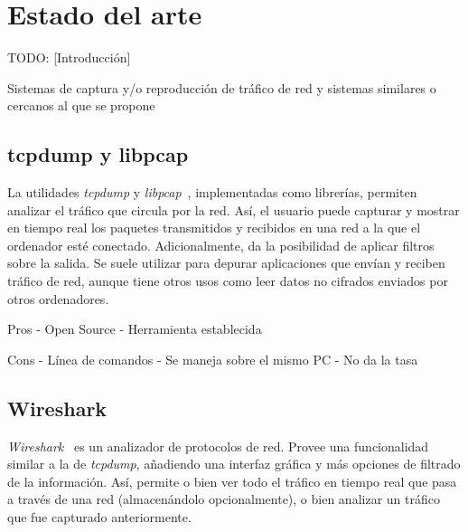 \chapter{Estado del arte\label{cap:estadoDelArte}}

TODO: [Introducción]


Sistemas de captura y/o reproducción de tráfico de red y sistemas similares o cercanos al que se propone

\section{tcpdump y libpcap\label{sec:eda:tcpdump}}

La utilidades \textit{tcpdump} y \textit{libpcap}~\cite{tcpdump}, implementadas como librerías, permiten analizar el tráfico que circula por la red.
Así, el usuario puede capturar y mostrar en tiempo real los paquetes transmitidos y recibidos en una red a la que el ordenador esté conectado.
Adicionalmente, da la posibilidad de aplicar filtros sobre la salida.
Se suele utilizar para depurar aplicaciones que envían y reciben tráfico de red, aunque tiene otros usos como leer datos no cifrados enviados por otros ordenadores.

Pros
- Open Source
- Herramienta establecida

Cons
- Línea de comandos
- Se maneja sobre el mismo PC
- No da la tasa

\section{Wireshark\label{sec:eda:wireshark}}

\textit{Wireshark}~\cite{wireshark} es un analizador de protocolos de red.
Provee una funcionalidad similar a la de \textit{tcpdump}, añadiendo una interfaz gráfica y más opciones de filtrado de la información.
Así, permite o bien ver todo el tráfico en tiempo real que pasa a través de una red (almacenándolo opcionalmente), o bien analizar un tráfico que fue capturado anteriormente.


